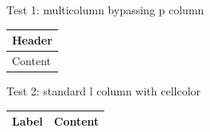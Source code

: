 ﻿\documentclass[10pt]{article}
\begin{document}
Test 1: multicolumn bypassing p column
\begin{tabular}{|p{5cm}|}
\hline
\multicolumn{1}{|c|}{\cellcolor{navy}\color{white} Header} \\
\hline
Content \\
\hline
\end{tabular}

Test 2: standard l column with cellcolor
\begin{tabular}{|>{\columncolor{ltgray}}l|p{5cm}|}
\hline
Label & Content \\
\hline
\end{tabular}
\end{document}
